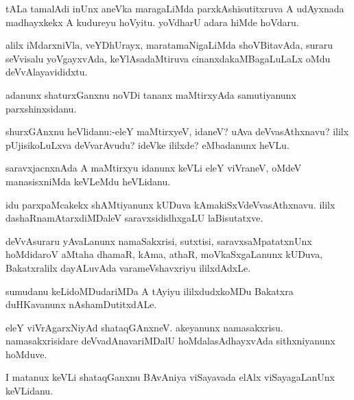 \documentclass{article}
\begin{document}
\begin{mn}%
tALa tamalAdi inUnx aneVka maragaLiMda parxkAshisutitxruva A udAyxnada madhayxkekx A 
kudureyu hoVyitu. yoVdharU adara hiMde hoVdaru.
\end{mn}

\begin{mn}%
alilx iMdarxniVla, veYDhUrayx, maratamaNigaLiMda shoVBitavAda, suraru seVvisalu 
yoVgayxvAda, keYlAsadaMtiruva cinanxdakaMBagaLuLaLx oMdu deVvAlayavididxtu.
\end{mn}

\begin{mn}%
adanunx shaturxGanxnu noVDi tananx maMtirxyAda samutiyanunx parxshinxsidanu.
\end{mn}

\begin{mn}%
shurxGAnxnu heVlidanu:-eleY maMtirxyeV, idaneV? uAva deVvasAthxnavu? ililx pUjisikoLuLxva 
deVvarAvudu? ideVke ililxde? eMbadanunx heVLu.
\end{mn}

\begin{mn}%
saravxjacnxnAda A maMtirxyu idanunx keVLi eleY viVraneV, oMdeV manasisxniMda keVLeMdu 
heVLidanu.
\end{mn}

\begin{mn}%
idu parxpaMcakekx shAMtiyanunx kUDuva kAmakiSxVdeVvasAthxnavu. ililx 
dashaRnamAtarxdiMDaleV saravxsididhxgaLU laBisutatxve.
\end{mn}

\begin{mn}%
deVvAsuraru yAvaLanunx namaSakxrisi, sutxtisi, saravxsaMpatatxnUnx hoMdidaroV aMtaha 
dhamaR, kAma, athaR, moVkaSxgaLanunx kUDuva, Bakatxralilx dayALuvAda varameVshavxriyu 
ililxdAdxLe.
\end{mn}

\begin{mn}%
sumudanu keLidoMDudariMDa A tAyiyu ililxdudxkoMDu Bakatxra duHKavanunx nAshamDutitxdALe.
\end{mn}

\begin{mn}%
eleY viVrAgarxNiyAd shataqGAnxneV. akeyanunx namasakxrisu. namasakxrisidare 
deVvadAnavariMDalU hoMdalasAdhayxvAda sithxniyanunx hoMduve.
\end{mn}

\begin{mn}%
I matanux keVLi shataqGanxnu BAvAniya viSayavada elAlx viSayagaLanUnx keVLidanu.
\end{mn}
\end{document}

